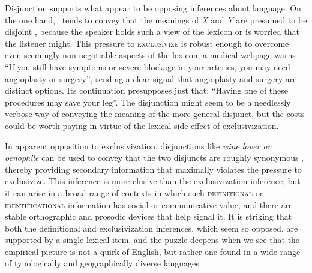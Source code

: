 \documentclass[12pt,twoside]{article}
\newcommand{\word}[1]{\emph{#1}}
\newcommand{\highlight}[1]{{\color{maroon}#1}}
\renewcommand{\_}{\textbf{\textunderscore\hspace{-4pt}\textunderscore\hspace{-3pt}\textunderscore\hspace{-4pt}\textunderscore}\hspace{0.5pt}}			%
\newcommand{\technicalTerm}[1]{\textsc{#1}}
\begin{document}
Disjunction supports what appear to be opposing inferences about
language. On the one hand, \XorY\ tends to convey that the meanings of
\word{X} and \word{Y} are presumed to be disjoint
\citep{Hurford:1974}, because the speaker holds such a view of the
lexicon or is worried that the listener might. This pressure to
\technicalTerm{exclusivize} is robust enough to overcome even
seemingly non-negotiable aspects of the lexicon; a medical webpage
warns ``If you still have symptoms or severe blockage in your
arteries, you may need \highlight{angioplasty or surgery}'', sending a
clear signal that angioplasty and surgery are distinct options. Its
continuation presupposes just that: ``Having one of these procedures
may save your leg''. The disjunction might seem to be a needlessly
verbose way of conveying the meaning of the more general disjunct, but
the costs could be worth paying in virtue of the lexical side-effect
of exclusivization.

In apparent opposition to exclusivization, disjunctions like
\word{wine lover or oenophile} can be used to convey that the two
disjuncts are roughly synonymous \citep{Horn89}, thereby providing
secondary information that maximally violates the pressure to
exclusivize. This inference is more elusive than the exclusivization
inference, but it can arise in a broad range of contexts in which such
\technicalTerm{definitional} or \technicalTerm{identificational}
information has social or communicative value, and there are stable
orthographic and prosodic devices that help signal it. It is striking
that both the definitional and exclusivization inferences, which seem
so opposed, are supported by a single lexical item, and the puzzle
deepens when we see that the empirical picture is not a quirk of
English, but rather one found in a wide range of typologically and
geographically diverse languages.
\end{document}
